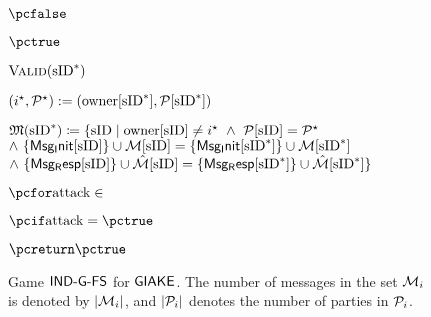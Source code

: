 \begin{figure}[h!]
{{\begin{minipage}[t]{\textwidth}
\begin{nicodemus}
					\item \quad \pcreturn $\pcfalse$ 
					\item \pcreturn $\pctrue$\\
				\end{nicodemus}
				\underline{$\ValidAttackO(\sID^*)$}
				\begin{nicodemus}
					\item $({i}^\star, \GakeUSet^\star) := (\owner[\sID^*], \GakeUSet[\sID^*])$						
					\item $\matchingSessions \coloneqq \{\sID \mid   \owner[\sID] \neq  {i}^\star~ \wedge ~ \GakeUSet[\sID]= \GakeUSet^\star ~$\\ 
					\hspace*{2em}$ \wedge~\changehighlight{\{\GIniMes[\sID]\}} \cup \GIniMesSet[\sID] = \changehighlight{\{\GIniMes[\sID^*]\}}\cup \GIniMesSet[\sID^*] ~$\\
					\hspace*{2em}$ \wedge~\changehighlight{\{\GResMes[\sID]\}} \cup \GResMesSet[\sID] = \changehighlight{\{\GResMes[\sID^*]\}}\cup \GResMesSet[\sID^*]\}$ 
					\item $\pcfor \attack\in$\hspace*{-0.1em} {\color{red}{Table wFS-optimized-table-gake}}
					\item \quad $\pcif \attack=\pctrue~ $
					\item \quad \quad $\pcreturn \pctrue$\label{line:attack-true-2-gake}
					\item \pcreturn \pcfalse
				\end{nicodemus}
			\end{minipage}
	}}
	\caption{
		Game $\GIAKEsecurityPFSGame$ for $\GIAKE$.
		The number of messages in the set $\GakeIniMesSet[\GakeUId]$ is denoted by $|\GakeIniMesSet[\GakeUId]|$, and 
		$|\peers_\GakeUId|$ denotes the number of parties in $\peers_\GakeUId$.
		\label{fig:game-ind-atk-gake}}
\end{figure}


